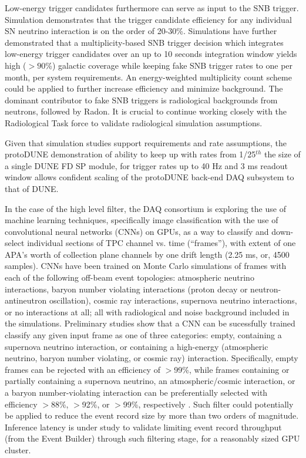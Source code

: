 Low-energy trigger candidates furthermore can serve as input to the
SNB trigger. Simulation demonstrates that the trigger candidate
efficiency for any individual SN neutrino interaction is on the order
of 20-30\%. Simulations have further demonstrated that a
multiplicity-based SNB trigger decision which integrates low-energy
trigger candidates over an up to 10 seconds
integration window yields high ($>90$\%) galactic coverage while
keeping fake SNB trigger rates to one per month, per system
requirements. An energy-weighted multiplicity count scheme could be
applied to further increase efficiency and minimize background.
The dominant contributor to fake SNB triggers is
radiological backgrounds from neutrons, followed by Radon. It is
crucial to continue working closely with the Radiological Task force
to validate radiological simulation assumptions.

Given that simulation studies support requirements and rate
assumptions, the protoDUNE demonstration of ability to keep up with
rates from 1/25$^{th}$ the size of a single DUNE FD SP module, for trigger
rates up to 40 Hz and 3 ms readout window 
allows confident scaling of the protoDUNE back-end DAQ subsystem to
that of DUNE.

In the case of the high level filter, the DAQ consortium is exploring the
use of machine learning techniques, specifically image classification
with the use of convolutional neural networks (CNNs) on GPUs, as a way to
classify and down-select individual sections of TPC channel vs. time
(``frames''), with extent of one APA's worth of collection plane
channels by one drift length (2.25 ms, or, 4500 samples). CNNs have
been trained on Monte Carlo simulations of frames with each of
the following off-beam event topologies: 
atmospheric neutrino interactions, baryon number violating
interactions (proton decay or neutron-antineutron oscillation), cosmic
ray interactions, supernova neutrino interactions, or no interactions at all; all
with radiological and noise background included in the
simulations. Preliminary studies show that a CNN can be sucessfully trained classify any
given input frame as one of three categories: empty, containing a supernova neutrino
interaction, or containing a high-energy (atmospheric neutrino, baryon
number violating, or cosmic ray) interaction. Specifically, empty frames can be
rejected with an efficiency of $>$99\%, while frames containing or
partially containing 
a supernova neutrino, an atmospheric/cosmic interaction, or a baryon
number-violating interaction can be preferentially selected with efficiency
$>$88\%, $>$92\%, or $>$99\%, respectively  \cite{docdb11311}. Such
filter could potentially be applied to reduce the event record size by
more than two orders of magnitude. Inference latency is under study to validate limiting event
record throughput (from the Event Builder) through such filtering
stage, for a reasonably sized GPU cluster. 


